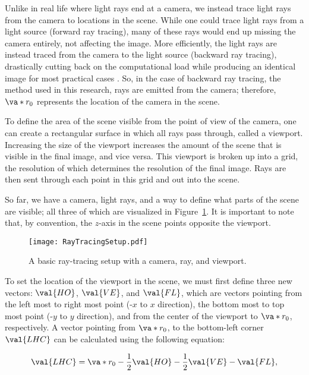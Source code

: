 \par Unlike in real life where light rays end at a camera, we instead trace light rays from the camera to locations in the scene. While one could trace light rays from a light source (forward ray tracing), many of these rays would end up missing the camera entirely, not affecting the image. More efficiently, the light rays are instead traced from the camera to the light source (backward ray tracing), drastically cutting back on the computational load while producing an identical image for most practical cases \cite{Peddie}. So, in the case of backward ray tracing, the method used in this research, rays are emitted from the camera; therefore, $\va*{r_0}$ represents the location of the camera in the scene.

\par To define the area of the scene visible from the point of view of the camera, one can create a rectangular surface in which all rays pass through, called a viewport. Increasing the size of the viewport increases the amount of the scene that is visible in the final image, and vice versa. This viewport is broken up into a grid, the resolution of which determines the resolution of the final image. Rays are then sent through each point in this grid and out into the scene.

\par So far, we have a camera, light rays, and a way to define what parts of the scene are visible; all three of which are visualized in Figure~\ref{fig:basic_ray_tracing_setup}. It is important to note that, by convention, the $z$-axis in the scene points opposite the viewport.

\begin{figure}[H]
  \centering
\texttt{[image: RayTracingSetup.pdf]}
\caption{A basic ray-tracing setup with a camera, ray, and viewport.}
\label{fig:basic_ray_tracing_setup}
\end{figure}

\par To set the location of the viewport in the scene, we must first define three new vectors: $\val{HO}$, $\val{VE}$, and $\val{FL}$, which are vectors pointing from the left most to right most point (-$x$ to $x$ direction), the bottom most to top most point (-$y$ to $y$ direction), and from the center of the viewport to $\va*{r_0}$, respectively. A vector pointing from $\va*{r_0}$, to the bottom-left corner $\val{LHC}$ can be calculated using the following equation:

\begin{equation}
  \val{LHC} = \va*{r_0} - \frac{1}{2}\val{HO} - \frac{1}{2}\val{VE} - \val{FL},
  \label{eq:LHC}
\end{equation}

